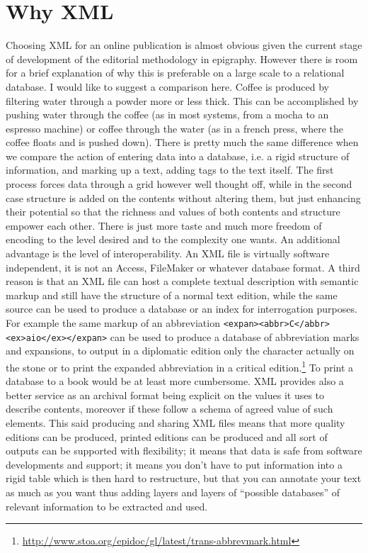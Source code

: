 \documentclass[amsthm,ebook]{saparticle}
\begin{document}
\section{Why XML}
\noindent Choosing XML for an online publication is almost obvious given the current stage of development of the editorial methodology in epigraphy. However there is room for a brief explanation of why this is preferable on a large scale to a relational database. I would like to suggest a comparison here. Coffee is produced by filtering water through a powder more or less thick. This can be accomplished by pushing water through the coffee (as in most systems, from a mocha to an espresso machine) or coffee through the water (as in a french press, where the coffee floats and is pushed down). There is pretty much the same difference when we compare the action of entering data into a database, i.e. a rigid structure of information, and marking up a text, adding tags to the text itself. The first process forces data through a grid however well thought off, while in the second case structure is added on the contents without altering them, but just enhancing their potential so that the richness and values of both contents and structure empower each other. There is just more taste and much more freedom of encoding to the level desired and to the complexity one wants. An additional advantage is the level of interoperability. An XML file is virtually software independent, it is not an Access, FileMaker or whatever database format. A third reason is that an XML file can host a complete textual description with semantic markup and still have the structure of a normal text edition, while the same source can be used to produce a database or an index for interrogation purposes. For example the same markup of an abbreviation \texttt{<expan><abbr>C</abbr><ex>aio</ex></expan>} can be used to produce a database of abbreviation marks and expansions, to output in a diplomatic edition only the character actually on the stone or to print the expanded abbreviation in a critical edition.\footnote{\url{http://www.stoa.org/epidoc/gl/latest/trans-abbrevmark.html}} To print a database to a book would be at least more cumbersome. XML provides also a better service as an archival format being explicit on the values it uses to describe contents, moreover if these follow a schema of agreed value of such elements. This said producing and sharing XML files means that more quality editions can be produced, printed editions can be produced and all sort of outputs can be supported with flexibility; it means that data is safe from software developments and support; it means you don't have to put information into a rigid table which is then hard to restructure, but that you can annotate your text as much as you want thus adding layers and layers of ``possible databases'' of relevant information to be extracted and used.   
\end{document}
